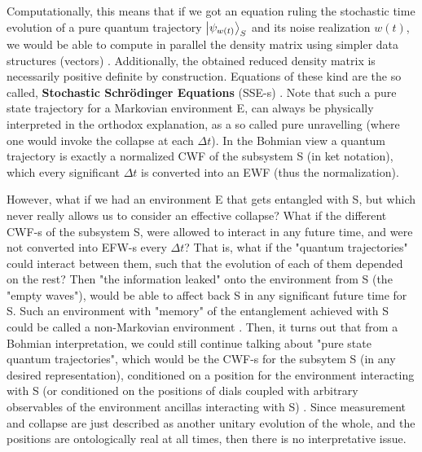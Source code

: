 \documentclass[11pt, a4paper]{article} %
\begin{document}
Computationally, this means that if we got an equation ruling the stochastic time evolution of a pure quantum trajectory $\ket{\psi_{w(t)}}_S$ and its noise realization $w(t)$, we would be able to compute in parallel the density matrix using simpler data structures (vectors) \cite{MarkovianityDefs, QuantumTrajs}. Additionally, the obtained reduced density matrix is necessarily positive definite by construction. Equations of these kind are the so called, {\bf Stochastic Schrödinger Equations} (SSE-s) \cite{Generalized, continousMeas}. Note that such a pure state trajectory for a Markovian environment E, can always be physically interpreted in the orthodox explanation, as a so called pure unravelling \cite{MarkovianityDefs} (where one would invoke the collapse at each $\Delta t$). In the Bohmian view a quantum trajectory is exactly a normalized CWF of the subsystem S (in ket notation), which every significant $\Delta t$ is converted into an EWF (thus the normalization).\vspace{-0.05cm}


However, what if we had an environment E that gets entangled with S, but which never really allows us to consider an effective collapse? What if the different CWF-s of the subsystem S, were allowed to interact in any future time, and were not converted into EFW-s every $\Delta t$? That is, what if the "quantum trajectories" could interact between them, such that the evolution of each of them depended on the rest? Then "the information leaked" onto the environment from S (the "empty waves"), would be able to affect back S in any significant future time for S. Such an environment with "memory" of the entanglement achieved with S could be called a non-Markovian environment \cite{MarkovianityDefs}. Then, it turns out that from a Bohmian interpretation, we could still continue talking about "pure state quantum trajectories", which would be the CWF-s for the subsytem S (in any desired representation), conditioned on a position for the environment interacting with S (or conditioned on the positions of dials coupled with arbitrary observables of the environment ancillas interacting with S) \cite{NMisModal, interpretSSE}. Since measurement and collapse are just described as another unitary evolution of the whole, and the positions are ontologically real at all times, then there is no interpretative issue.\vspace{-0.05cm}
\end{document}
